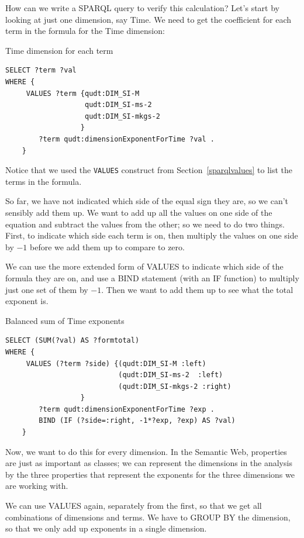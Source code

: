 How can we write a SPARQL query to verify this calculation?  Let's start by 
looking at just one dimension, say Time.  We need to get the coefficient for each
term in the formula for the Time dimension:

\begin{query}Time dimension for each term\end{query}
\begin{lstlisting}
SELECT ?term ?val
WHERE { 
     VALUES ?term {qudt:DIM_SI-M
                   qudt:DIM_SI-ms-2 
                   qudt:DIM_SI-mkgs-2 
                  }
        ?term qudt:dimensionExponentForTime ?val .
    } 
\end{lstlisting}

Notice that we used the \texttt{VALUES} construct from Section~\ref{sparqlvalues} to 
list the terms in the formula.  

So far, we have not indicated which side of the equal sign they
are, so we can't sensibly add them up.  We want to add up all the 
values on one side of the equation and subtract the values from the other;
so we need to do two things.  First, to indicate which side each term is on,
then multiply the values on one side by $-1$ before we add them up to 
compare to zero.   

We can use the more extended form of VALUES to indicate which side of the 
formula they are on, and use a BIND statement (with an IF function) to 
multiply just one set of them by $-1$.  Then we want to add them up to 
see what the total exponent is. 

\begin{query}Balanced sum of Time exponents\end{query}
\begin{lstlisting}
SELECT (SUM(?val) AS ?formtotal)
WHERE { 
     VALUES (?term ?side) {(qudt:DIM_SI-M :left)
                           (qudt:DIM_SI-ms-2  :left)
                           (qudt:DIM_SI-mkgs-2 :right)
                  }
        ?term qudt:dimensionExponentForTime ?exp .
        BIND (IF (?side=:right, -1*?exp, ?exp) AS ?val)
    } 
\end{lstlisting}

Now, we want to do this for every dimension.  In the Semantic Web, properties
are just as important as classes; we can represent the dimensions in the 
analysis by the three properties that represent the exponents for the three 
dimensions we are working with.  

We can use VALUES again, separately from the first, so that we get all combinations 
of dimensions and terms.  We have to GROUP BY the dimension, so that we only add up
exponents in a single dimension. 

